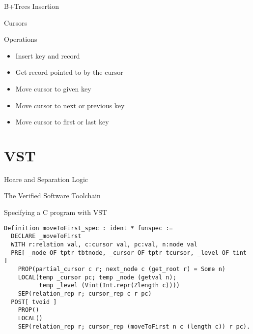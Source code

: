 \documentclass[page number,usenames,dvipsnames]{beamer}
\begin{document}
\begin{frame}{B+Trees Insertion}
  \beforeinsert
  \vfill
  \pause
  \afterinsert
\end{frame}

\begin{frame}{Cursors}
  \cursor
  \vfill
  \begin{block}{Operations}
    \begin{itemize}
    \item Insert key and record
    \item Get record pointed to by the cursor
    \item Move cursor to given key
    \item Move cursor to next or previous key
    \item Move cursor to first or last key
    \end{itemize}
  \end{block}
\end{frame}

\section{VST}
\begin{frame}{Hoare and Separation Logic}

  
\end{frame}

\begin{frame}{The Verified Software Toolchain}

  
\end{frame}

\begin{frame}[fragile]{Specifying a C program with VST}
 \begin{lstlisting}[language=Coq,basicstyle=\scriptsize]
Definition moveToFirst_spec : ident * funspec :=
  DECLARE _moveToFirst
  WITH r:relation val, c:cursor val, pc:val, n:node val
  PRE[ _node OF tptr tbtnode, _cursor OF tptr tcursor, _level OF tint ]
    PROP(partial_cursor c r; next_node c (get_root r) = Some n)
    LOCAL(temp _cursor pc; temp _node (getval n);
          temp _level (Vint(Int.repr(Zlength c))))
    SEP(relation_rep r; cursor_rep c r pc)
  POST[ tvoid ]
    PROP()
    LOCAL()
    SEP(relation_rep r; cursor_rep (moveToFirst n c (length c)) r pc).
\end{lstlisting}
\end{frame}
\end{document}
